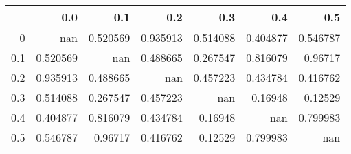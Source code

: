 \begin{tabular}{rrrrrrr}
\toprule
     &        0.0 &        0.1 &        0.2 &        0.3 &        0.4 &        0.5 \\
\midrule
 0   & nan        &   0.520569 &   0.935913 &   0.514088 &   0.404877 &   0.546787 \\
 0.1 &   0.520569 & nan        &   0.488665 &   0.267547 &   0.816079 &   0.96717  \\
 0.2 &   0.935913 &   0.488665 & nan        &   0.457223 &   0.434784 &   0.416762 \\
 0.3 &   0.514088 &   0.267547 &   0.457223 & nan        &   0.16948  &   0.12529  \\
 0.4 &   0.404877 &   0.816079 &   0.434784 &   0.16948  & nan        &   0.799983 \\
 0.5 &   0.546787 &   0.96717  &   0.416762 &   0.12529  &   0.799983 & nan        \\
\bottomrule
\end{tabular}